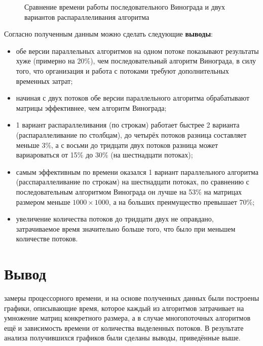 \begin{figure}[h]
\caption{Сравнение времени работы последовательного Винограда и двух вариантов распараллеливания алгоритма}
\label{fig6:graph}
\end{figure}

\newpage

Согласно полученным данным можно сделать следующие \textbf{выводы}:
\begin{itemize}
	\item обе версии параллельных алгоритмов на одном потоке показывают результаты хуже (примерно на 20\%), чем последовательный алгоритм Винограда, в силу того, что организация и работа с потоками требуют дополнительных временных затрат;
	\item начиная с двух потоков обе версии параллельного алгоритма обрабатывают матрицы эффективнее, чем алгоритм Винограда;
	\item 1 вариант распараллеливания (по строкам) работает быстрее 2 варианта (распараллеливание по столбцам), до четырёх потоков разница составляет меньше 3\%, а с восьми до тридцати двух потоков разница может вариароваться от 15\% до 30\% (на шестнадцати потоках);
	\item самым эффективным по времени оказался 1 вариант параллельного алгоритма (расспараллеливание по строкам) на шестнадцати потоках, по сравнению с последовательным алгоритмом Винограда он лучше на 53\% на матрицах размером меньше $1000 \times 1000$, а на больших преимущество превышает 70\%;
	\item увеличение количества потоков до тридцати двух не оправдано, затрачиваемое время значительно больше того, что было при меньшем количестве потоков.
	\end{itemize}

\section*{Вывод}
 замеры процессорного времени, и на основе полученных данных были построены графики, описывающие время, которое каждый из алгоритмов затрачивает на умножение матриц конкретного размера, а в случае многопоточных алгоритмов ещё и зависимость времени от количества выделенных потоков. В результате анализа получившихся графиков были сделаны выводы, приведённые выше.


